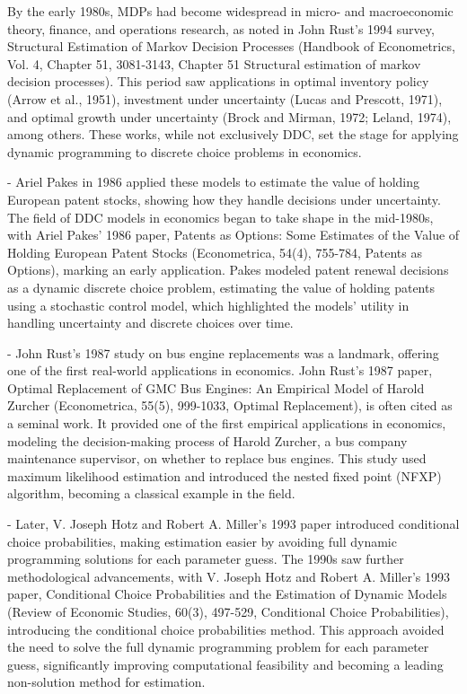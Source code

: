 \documentclass[a4paper,12pt,oneside]{book} %
\begin{document}
By the early 1980s, MDPs had become widespread in micro- and macroeconomic theory, finance, and operations research, as noted in John Rust's 1994 survey, Structural Estimation of Markov Decision Processes (Handbook of Econometrics, Vol. 4, Chapter 51, 3081-3143, Chapter 51 Structural estimation of markov decision processes). This period saw applications in optimal inventory policy (Arrow et al., 1951), investment under uncertainty (Lucas and Prescott, 1971), and optimal growth under uncertainty (Brock and Mirman, 1972; Leland, 1974), among others. These works, while not exclusively DDC, set the stage for applying dynamic programming to discrete choice problems in economics.



- Ariel Pakes in 1986 applied these models to estimate the value of holding European patent stocks, showing how they handle decisions under uncertainty. 
The field of DDC models in economics began to take shape in the mid-1980s, with Ariel Pakes' 1986 paper, Patents as Options: Some Estimates of the Value of Holding European Patent Stocks (Econometrica, 54(4), 755-784, Patents as Options), marking an early application. Pakes modeled patent renewal decisions as a dynamic discrete choice problem, estimating the value of holding patents using a stochastic control model, which highlighted the models' utility in handling uncertainty and discrete choices over time.


- John Rust's 1987 study on bus engine replacements was a landmark, offering one of the first real-world applications in economics. 
John Rust's 1987 paper, Optimal Replacement of GMC Bus Engines: An Empirical Model of Harold Zurcher (Econometrica, 55(5), 999-1033, Optimal Replacement), is often cited as a seminal work. It provided one of the first empirical applications in economics, modeling the decision-making process of Harold Zurcher, a bus company maintenance supervisor, on whether to replace bus engines. This study used maximum likelihood estimation and introduced the nested fixed point (NFXP) algorithm, becoming a classical example in the field.


- Later, V. Joseph Hotz and Robert A. Miller's 1993 paper introduced conditional choice probabilities, making estimation easier by avoiding full dynamic programming solutions for each parameter guess.
The 1990s saw further methodological advancements, with V. Joseph Hotz and Robert A. Miller's 1993 paper, Conditional Choice Probabilities and the Estimation of Dynamic Models (Review of Economic Studies, 60(3), 497-529, Conditional Choice Probabilities), introducing the conditional choice probabilities method. This approach avoided the need to solve the full dynamic programming problem for each parameter guess, significantly improving computational feasibility and becoming a leading non-solution method for estimation.
\end{document}

